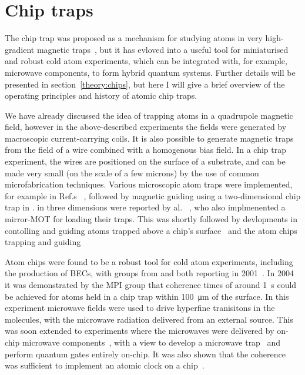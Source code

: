 \section{Chip traps}


The chip trap was proposed as a mechanism for studying atoms in very
high-gradient magnetic traps~\cite{PhysRevA.52.4004}, but it has evloved into a
useful tool for miniaturised and robust cold atom experiments, which can be
integrated with, for example, microwave components, to form hybrid quantum
systems. Further details will be presented in section~\ref{theory:chips}, but
here I will give a brief overview of the operating principles and history of
atomic chip traps.

We have already discussed the idea of trapping atoms in a quadrupole magnetic
field, however in the above-described experiments the fields were generated by
macroscopic current-carrying coils. It is also possible to generate magnetic
traps from the field of a wire combined with a homogenous bias field. In a chip
trap experiment, the wires are positioned on the surface of a substrate, and
can be made very small (on the scale of a few microns) by the use of common
microfabrication techniques. Various microscopic atom traps were implemented,
for example in Ref.s~\cite{PhysRevLett.80.1634, PhysRevLett.81.5310,
Drindic1998}  ,
followed by magnetic guiding using a two-dimensional chip trap in
 . %
in three dimensions were reported by  al.~\cite{Reichel1999}
, who also implmenented a mirror-MOT for loading their traps. This was
shortly followed by devlopments in contolling and guiding atoms trapped above a
chip's surface~\cite{Folman2000} and the 
%
atom chips trapping and guiding \cite{Folman2000}

Atom chips were found to be a robust tool for cold atom experiments, including
the production of BECs, with groups from  and 
both reporting   in 2001~\cite{Hansel2001,
dtt2001}. In 2004 it was demonstrated by the MPI group that coherence times 
of around \SI{1}{\second} could be achieved for \esRB{} atoms held in a chip
trap within \SI{100}{\micro\meter} of the surface. In this experiment microwave
fields were used to drive hyperfine tranisitons in the molecules, with the
microwave radiation delivered from an external source. This was soon extended to
experiments where the microwaves were delivered by on-chip microwave
components~\cite{Treutlein2008, Boehi2009}, with a view to develop a microwave
trap~\cite{} and perform quantum gates entirely on-chip. It was also shown that
the coherence was sufficient to implement an atomic clock on a
chip~\cite{Knappe2004}.
%
%

